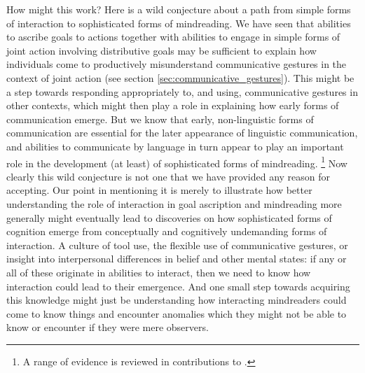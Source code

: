 \documentclass[14pt,a4paper]{extarticle}
\begin{document}
How might this work?
Here is a wild conjecture about
a path from simple forms of interaction to sophisticated forms of mindreading.
We have seen that 
	abilities to ascribe goals to actions 
 together with
	abilities to engage in simple forms of joint action involving distributive goals
 may be sufficient to explain how individuals come to productively misunderstand communicative gestures in the context of joint action (see section \vref{sec:communicative_gestures}).
This might  be a step towards responding appropriately to, and using, communicative gestures in other contexts,
which might then play a role in explaining how early forms of communication emerge.
But we know that early, non-linguistic forms of communication are essential for the later appearance of linguistic communication,
and abilities to communicate by language in turn appear to play an important role in the development (at least) of sophisticated forms of mindreading.%
\footnote{
A range of evidence is reviewed in contributions to \citet{Astington2005ot}.
}
Now clearly this wild conjecture is not one that we have provided any reason for accepting.
Our point in mentioning it is merely to illustrate how
 better understanding the role of interaction in goal ascription and  mindreading more generally
might eventually lead to discoveries
on how
 sophisticated forms of cognition
 emerge from
 conceptually and cognitively undemanding forms of interaction.
A culture of tool use,
	the flexible use of communicative gestures,
	or insight into interpersonal differences in belief and other mental states:
if any or all of these 
originate in abilities to interact,
then we need to know how interaction could lead to their emergence.
And one small step towards acquiring this knowledge might just be 
understanding how interacting mindreaders 
could 
	come to know things 
	and
	encounter anomalies
which they might not be able to know or encounter if they were mere observers.



\end{document}
